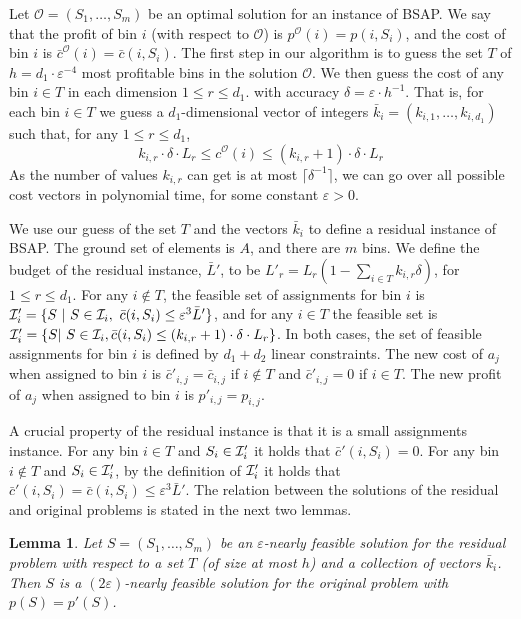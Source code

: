 \documentclass[11pt]{article}
\newtheorem{lemma}[theorem]{Lemma}
\newcommand{\eps}{\varepsilon}
\newcommand{\bk}{\bar{k}}
\newcommand{\bS}{S}
\newcommand{\cI}{{\cal I}}
\newcommand{\bL}{\bar{L}}
\newcommand{\bc}{\bar{c}}
\newcommand{\mO}{\mathcal{O}}
\begin{document}
{Let $\mO= (S_1,\ldots,S_m)$ be an optimal solution for an instance of BSAP. We say that the profit of bin $i$ (with respect to $\mO$) is
$p^{\mO} (i)= p(i,S_i)$, and the cost of bin $i$ is $\bc^{\mO}(i) = \bc(i,S_i)$. The first step in our algorithm is to guess the set $T$ of
$h=d_1\cdot \eps^{-4} $ most profitable bins in the solution $\mO$.
 We then guess the cost of any bin $i \in T$ in each dimension $1 \leq r \leq d_1$.
with
accuracy $\delta= \eps \cdot h^{-1}$.
That is,
for each bin $i\in T$ we guess a $d_1$-dimensional vector of integers
$\bk_i=(k_{i,1},\ldots,k_{i,d_1})$ such that, for any $1\leq r \leq d_1$,
\begin{equation}
\label{eqn:reduction_guess}
k_{i,r} \cdot \delta \cdot L_r \leq c^{\mO}(i) \leq (k_{i,r}+1) \cdot  \delta \cdot L_r
\end{equation}
As the number of values $k_{i,r}$ can get is at most  $\lceil \delta^{-1} \rceil$, we can
go over all possible cost vectors in polynomial time, for some constant $\eps > 0$.

We use our guess of the set $T$ and the vectors $\bk_i$ to define a residual instance of BSAP. The ground set of elements is $A$, and there are
$m$ bins. We define the  budget of the residual instance, $\bL'$, to be $L'_r = L_r (1-\sum_{i\in T} k_{i,r} \delta )$, for $1 \leq r \leq d_1$.
For any $i\notin T$, the feasible set of assignments for bin $i$ is $\cI'_i= \{ S~|~ S\in \cI_i,~ \bc(i,S_i)\leq \eps^3 \bL' \}$, and for any
$i\in T$ the feasible set is $\cI'_i = \{ S |~ S \in \cI_i, \bc(i,S_i)  \leq (k_{i,r}+1)\cdot \delta \cdot  L_r \}$. In both cases, the set of
feasible assignments for bin $i$ is defined by $d_1+d_2$ linear constraints. The new cost of $a_j$ when assigned to bin $i$ is $\bc'_{i,j} =
\bc_{i,j}$ if $i \notin T$ and $\bc'_{i,j} = 0$ if $i\in T$. The new profit of $a_j$ when assigned to bin $i$ is $p'_{i,j}= p_{i,j}$.

A crucial property of the residual instance is that it is a small assignments instance.
 For any bin
$i\in T$ and $S_i \in \cI'_i$ it holds that $\bc'(i,S_i) = 0$. For any bin $i\notin T$ and $S_i \in \cI'_i$,
by the definition of $\cI'_i$ it holds that $\bc'(i,S_i)= \bc(i,S_i)\leq \eps^3 \bL'$.
The relation between the solutions of the residual and original
problems is stated in the next two lemmas.

\begin{lemma}
\label{thm:reduction_lemma1}
Let $\bS=(S_1,\ldots,S_m)$ be an $\eps$-nearly feasible  solution for the residual problem with respect
to a set $T$ (of size at most $h$) and a collection of vectors $\bk_i$. Then $\bS$ is a
$(2\eps)$-nearly feasible  solution for the original problem with $p(\bS)=p'(\bS)$.
\end{lemma}

}
\end{document}
